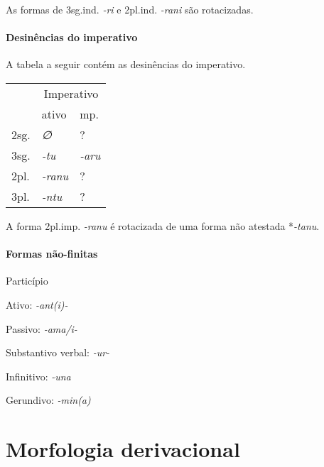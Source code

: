 \noindent As formas de 3sg.ind. \emph{-ri} e 2pl.ind. \emph{-rani} são
rotacizadas.

\paragraph{Desinências do imperativo}
A tabela a seguir contém as desinências do imperativo.

\begin{center}
	\begin{tabular}[c]{lll}
		\toprule
		&\multicolumn{2}{c}{Imperativo}\\
		& ativo & mp.\\
		\midrule
		2sg. &  \emph{∅}                           & {?} \\
		3sg. & \emph{-tu} & \emph{-aru} \\
		\midrule
		2pl. & \emph{-ranu}                                          & {?}\\
		3pl. & \emph{-ntu}                                           & {?} \\
		\bottomrule
	\end{tabular}
\end{center}

\noindent A forma 2pl.imp. \emph{-ranu} é rotacizada de uma forma não atestada
*\emph{-tanu}.

\paragraph{Formas não-finitas}

\begin{compactitem}
\item Particípio
	\begin{compactitem}
	\item Ativo: \emph{-ant{(i)}-}
	\item Passivo: \emph{-ama\slash{}i-}
	\end{compactitem}
\item Substantivo verbal: \emph{-ur-}	
\item Infinitivo: \emph{-una}
\item Gerundivo: \emph{-min{(a)}}
\end{compactitem}

\section{Morfologia derivacional}


